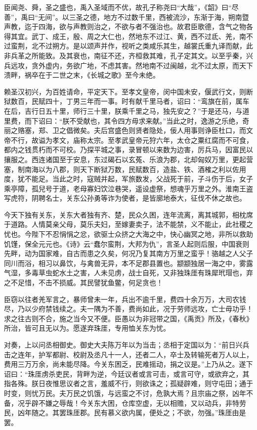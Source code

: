 \documentclass[12pt,UTF8]{ctexbook}
\begin{document}
臣闻尧、舜，圣之盛也，禹入圣域而不优，故孔子称尧曰“大哉”，《韶》曰“尽善”，禹曰“无间”。以三圣之德，地方不过数千里，西被流沙，东渐于海，朔南暨声教，迄于四海，欲与声教则治之，不欲与者不强治也。故君臣歌德，含气之物各得其宜。武丁、成王，殷、周之大仁也，然地东不过江、黄，西不过氐、羌，南不过蛮荆，北不过朔方。是以颂声并作，视听之类咸乐其生，越裳氏重九译而献，此非兵革之所能致。及其衰也，南征不还，齐桓救其难，孔子定其文。以至乎秦，兴兵远攻，贪外虚内，务欲广地，不虑其害。然地南不过闽越，北不过太原，而天下溃畔，祸卒在于二世之末，《长城之歌》至今未绝。



赖圣汉初兴，为百姓请命，平定天下。至孝文皇帝，闵中国未安，偃武行文，则断狱数百，民赋四十，丁男三年而一事。时有献千里马者，诏曰：“鸾旗在前，属车在后，吉行日五十里，师行三十里，朕乘千里之马，独先安之？”于是还马，与道里费，而下诏曰：“朕不受献也，其令四方毋求来献。”当此之时，逸游之乐绝，奇丽之赂塞，郑、卫之倡微矣。夫后宫盛色则贤者隐处，佞人用事则诤臣杜口，而文帝不行，故谥为孝文，庙称太宗。至孝武皇帝元狩六年，太仓之粟红腐而不可食，都内之钱贯朽而不可校。乃探平城之事，录冒顿以来数为边害，厉兵马，因富民以攘服之。西连诸国至于安息，东过碣石以玄菟、乐浪为郡，北却匈奴万里，更起营塞，制南海以为八郡，则天下断狱万数，民赋数百，造盐、铁、酒榷之利以佐用度，犹不能足。当此之时，寇贼并起，军旅数发，父战死于前，子斗伤于后，女子乘亭障，孤兒号于道，老母寡妇饮泣巷哭，遥设虚祭，想魂乎万里之外。淮南王盗写虎符，阴聘名士，关东公孙勇等诈为使者，是皆廓地泰大，征伐不休之故也。



今天下独有关东，关东大者独有齐、楚，民众久困，连年流离，离其城郭，相枕席于道路。人情莫亲父母，莫乐夫妇，至嫁妻卖子，法不能禁，义不能止，此社稷之忧也。今陛下不忍悁悁之忿，欲驱士众挤之大海之中，快心幽冥之地，非所以救助饥馑，保全元元也。《诗》云“蠢尔蛮荆，大邦为仇”，言圣人起则后服，中国衰则先畔，动为国家难，自古而患之久矣，何况乃复其南方万里之蛮乎！骆越之人父子同川而浴，相习以鼻饮，与禽兽无异，本不足郡县置也。颛颛独居一海之中，雾露气湿，多毒草虫蛇水土之害，人未见虏，战士自死，又非独珠厓有珠犀玳瑁也，弃之不足惜，不击不损威。其民譬犹鱼鳖，何足贪也！



臣窃以往者羌军言之，暴师曾未一年，兵出不逾千里，费四十余万万，大司农钱尽，乃以少府禁钱续之。夫一隅为不善，费尚如此，况于劳师远攻，亡士毋功乎！求之往古则不合，施之当今又不便。臣愚以为非冠带之国，《禹贡》所及，《春秋》所治，皆可且无以为。愿遂弃珠厓，专用恤关东为忧。



对奏，上以问丞相御史。御史大夫陈万年以为当击；丞相于定国以为：“前日兴兵击之连年，护军都尉、校尉及丞凡十一人，还者二人，卒士及转输死者万人以上，费用三万万余，尚未能尽降。今关东困乏，民难摇动，捐之议是。”上乃从之。遂下诏曰：“珠厓虏杀吏民，背畔为逆，今廷议者或言可击，或言可守，或欲弃之，其指各殊。朕日夜惟思议者之言，羞威不行，则欲诛之；孤疑辟难，则守屯田；通于时变，则忧万民。夫万民之饥饿，与远蛮之不讨，危孰大焉？且宗庙之祭，凶年不备，况乎辟不嫌之辱哉！今关东大困，仓库空虚，无以相赡，又以动兵，非特劳民，凶年随之。其罢珠厓郡。民有慕义欲内属，便处之；不欲，勿强。”珠厓由是罢。
\end{document}
